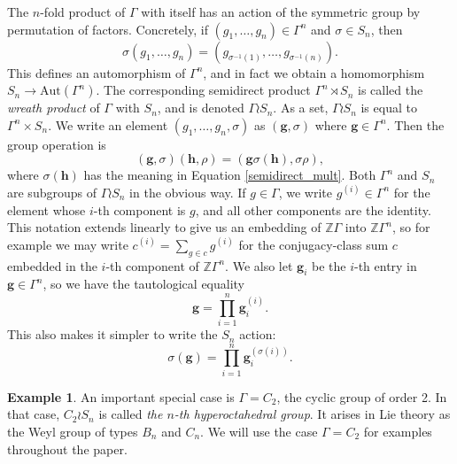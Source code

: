 \documentclass[10pt]{article}
\theoremstyle{definition}
\newtheorem{example}[theorem]{Example}
\begin{document}
The $n$-fold product of $\Gamma$ with itself has an action of the symmetric group by permutation of factors. Concretely, if $(g_1, \ldots, g_n) \in \Gamma^n$ and $\sigma \in S_n$, then
\begin{equation} \label{semidirect_mult}
\sigma (g_1, \ldots, g_n) = (g_{\sigma^{-1}(1)}, \ldots, g_{\sigma^{-1}(n)}).
\end{equation}
This defines an automorphism of $\Gamma^n$, and in fact we obtain a homomorphism $S_n \to \mathrm{Aut}(\Gamma^n)$. The corresponding semidirect product $\Gamma^n \rtimes S_n$ is called the \emph{wreath product} of $\Gamma$ with $S_n$, and is denoted $\Gamma \wr S_n$. As a set, $\Gamma \wr S_n$ is equal to $\Gamma^n \times S_n$. We write an element $(g_1, \ldots, g_n, \sigma)$ as $(\mathbf{g}, \sigma)$ where $\mathbf{g} \in \Gamma^n$. Then the group operation is
\[
(\mathbf{g}, \sigma) (\mathbf{h}, \rho) = (\mathbf{g} \sigma(\mathbf{h}), \sigma \rho),
\]
where $\sigma(\mathbf{h})$ has the meaning in Equation \eqref{semidirect_mult}. Both $\Gamma^n$ and $S_n$ are subgroups of $\Gamma \wr S_n$ in the obvious way. If $g \in \Gamma$, we write $g^{(i)} \in \Gamma^n$ for the element whose $i$-th component is $g$, and all other components are the identity. This notation extends linearly to give us an embedding of $\mathbb{Z}\Gamma$ into $\mathbb{Z}\Gamma^n$, so for example we may write $c^{(i)} = \sum_{g \in c} g^{(i)}$ for the conjugacy-class sum $c$ embedded in the $i$-th component of $\mathbb{Z}\Gamma^n$. We also let $\mathbf{g}_i$ be the $i$-th entry in $\mathbf{g} \in \Gamma^n$, so we have the tautological equality
\[
\mathbf{g} = \prod_{i=1}^n \mathbf{g}_i^{(i)}.
\]
This also makes it simpler to write the $S_n$ action:
\[
\sigma(\mathbf{g}) = \prod_{i=1}^n \mathbf{g}_{i}^{(\sigma(i))}.
\]
\begin{example}
An important special case is $\Gamma = C_2$, the cyclic group of order 2. In that case, $C_2 \wr S_n$ is called \emph{the $n$-th hyperoctahedral group}. It arises in Lie theory as the Weyl group of types $B_n$ and $C_n$. We will use the case $\Gamma = C_2$ for examples throughout the paper.
\end{example}
\end{document}
